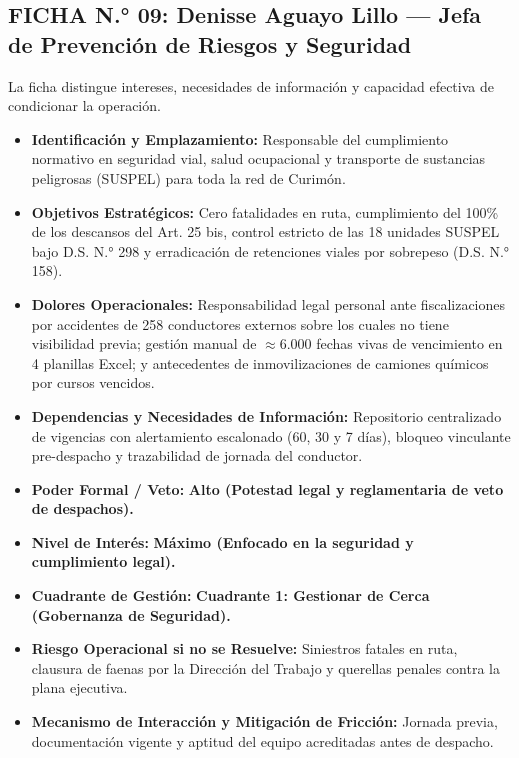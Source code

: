 \subsection*{FICHA N.° 09: Denisse Aguayo Lillo — Jefa de Prevención de Riesgos y Seguridad}
La ficha distingue intereses, necesidades de información y capacidad efectiva de condicionar la operación.
\begin{itemize}
\item \textbf{Identificación y Emplazamiento:} Responsable del cumplimiento normativo en seguridad vial, salud ocupacional y transporte de sustancias peligrosas (SUSPEL) para toda la red de Curimón.
\item \textbf{Objetivos Estratégicos:} Cero fatalidades en ruta, cumplimiento del 100\% de los descansos del Art. 25 bis, control estricto de las 18 unidades SUSPEL bajo D.S. N.° 298 y erradicación de retenciones viales por sobrepeso (D.S. N.° 158).
\item \textbf{Dolores Operacionales:} Responsabilidad legal personal ante fiscalizaciones por accidentes de 258 conductores externos sobre los cuales no tiene visibilidad previa; gestión manual de $\approx 6.000$ fechas vivas de vencimiento en 4 planillas Excel; y antecedentes de inmovilizaciones de camiones químicos por cursos vencidos.
\item \textbf{Dependencias y Necesidades de Información:} Repositorio centralizado de vigencias con alertamiento escalonado (60, 30 y 7 días), bloqueo vinculante pre-despacho y trazabilidad de jornada del conductor.
\item \textbf{Poder Formal / Veto:} \textbf{Alto (Potestad legal y reglamentaria de veto de despachos).}
\item \textbf{Nivel de Interés:} \textbf{Máximo (Enfocado en la seguridad y cumplimiento legal).}
\item \textbf{Cuadrante de Gestión:} \textbf{Cuadrante 1: Gestionar de Cerca (Gobernanza de Seguridad).}
\item \textbf{Riesgo Operacional si no se Resuelve:} Siniestros fatales en ruta, clausura de faenas por la Dirección del Trabajo y querellas penales contra la plana ejecutiva.
\item \textbf{Mecanismo de Interacción y Mitigación de Fricción:} Jornada previa, documentación vigente y aptitud del equipo acreditadas antes de despacho.
\end{itemize}

